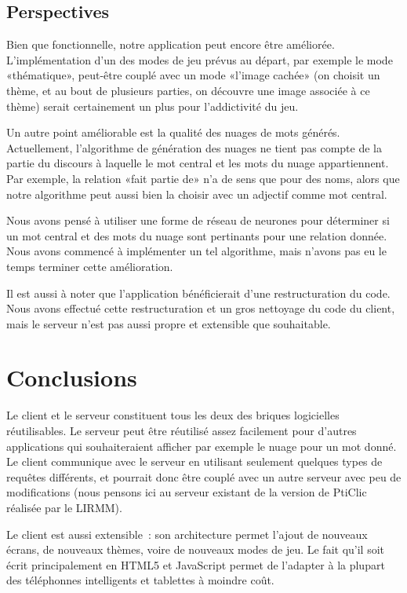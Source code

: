 \documentclass[a4paper,11pt,french]{article}
\begin{document}
\subsection{Perspectives}

Bien que fonctionnelle, notre application peut encore être améliorée. L'implémentation d'un des modes de jeu prévus au départ, par exemple
le mode «thématique», peut-être couplé avec un mode «l'image cachée» (on choisit un thème, et au bout de plusieurs parties, on découvre une
image associée à ce thème) serait certainement un plus pour l'addictivité du jeu.

Un autre point améliorable est la qualité des nuages de mots générés. Actuellement, l'algorithme de génération des nuages ne tient pas
compte de la partie du discours à laquelle le mot central et les mots du nuage appartiennent. Par exemple, la relation «fait partie de» n'a
de sens que pour des noms, alors que notre algorithme peut aussi bien la choisir avec un adjectif comme mot central.

Nous avons pensé à utiliser une forme de réseau de neurones pour déterminer si un mot central et des mots du nuage sont pertinants pour une
relation donnée. Nous avons commencé à implémenter un tel algorithme, mais n'avons pas eu le temps terminer cette amélioration.

Il est aussi à noter que l'application bénéficierait d'une restructuration du code. Nous avons effectué cette restructuration et un gros
nettoyage du code du client, mais le serveur n'est pas aussi propre et extensible que souhaitable.

\section{Conclusions}

Le client et le serveur constituent tous les deux des briques logicielles réutilisables. Le serveur peut être réutilisé assez facilement
pour d'autres applications qui souhaiteraient afficher par exemple le nuage pour un mot donné. Le client communique avec le serveur en
utilisant seulement quelques types de requêtes différents, et pourrait donc être couplé avec un autre serveur avec peu de modifications
(nous pensons ici au serveur existant de la version de PtiClic réalisée par le LIRMM).

Le client est aussi extensible~: son architecture permet l'ajout de nouveaux écrans, de nouveaux thèmes, voire de nouveaux modes de jeu. Le
fait qu'il soit écrit principalement en HTML5 et JavaScript permet de l'adapter à la plupart des téléphonnes intelligents et tablettes à
moindre coût.
\end{document}
